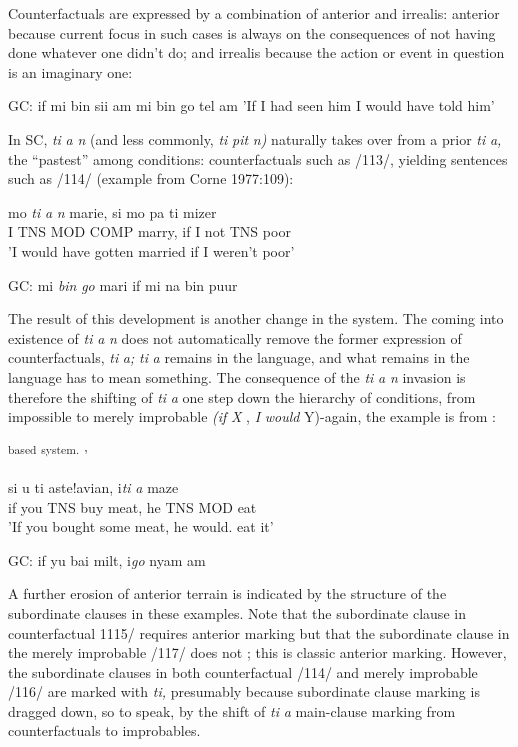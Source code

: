 Counterfactuals are expressed by a combination of anterior and irrealis: anterior because current focus in such cases is always on the conse\-quences of not having done whatever one didn't do; and irrealis because the action or event in question is an imaginary one:

\ea\label{ex:113}
 GC: if mi bin sii am mi bin go tel am
\glt'If I had seen him I would have told him'
\z



In SC, \textit{ti} \textit{a} \textit{n} (and less commonly, \textit{ti} \textit{pit} \textit{n}\textit{)} naturally takes over from a prior \textit{ti} \textit{a,} the ``pastest'' among conditions: counterfactuals such
as /113/, yielding sentences such as /114/ (example from Corne 1977:109):

\ea\label{ex:114}
\gll mo \textit{ti} \textit{a} \textit{n} marie, si mo pa ti mizer\\
I TNS MOD COMP marry, if I not TNS poor\\
\glt 'I would have gotten married if I weren't poor' 
\z


\ea\label{ex:115}
GC: mi \textit{bin} \textit{go} mari if mi na bin puur
\z

The result of this development is another change in the system. The coming into existence of \textit{ti} \textit{a} \textit{n} does not automatically remove the former expression of counterfactuals, \textit{ti} \textit{a;} \textit{ti} \textit{a} remains in the lan\-guage, and what remains in the language has to mean something. The consequence of the \textit{ti} \textit{a} \textit{n} invasion is therefore the shifting of \textit{ti} \textit{a} one step down the hierarchy of conditions, from impossible to merely
improbable \textit{(}\textit{i}\textit{f} \textit{X} , \textit{I} \textit{would} Y){}-again, the example is from \citet[106]{Corne1977}:

\textsuperscript{based} \textsuperscript{system. }'

\ea\label{ex:116}
\gll si u ti aste!avian, i\textit{ti} \textit{a} maze\\
if you TNS buy meat, he TNS MOD eat\\
\glt 'If you bought some meat, he would. eat it'
\z

\ea\label{ex:117}
GC: if yu bai milt, i\textit{go} nyam am
\z

A further erosion of anterior terrain is indicated by the structure of the subordinate clauses in these examples. Note that the subordinate clause in counterfactual 1115/ requires anterior marking but that the subordinate clause in the merely improbable /117/ does not ; this is classic anterior marking. However, the subordinate clauses in both counterfactual /114/ and merely improbable /116/ are marked with \textit{ti,} presumably because subordinate clause marking is dragged down, so to speak, by the shift of \textit{ti} \textit{a} main-clause marking from counterfactuals
to improbables.

